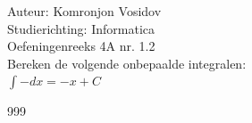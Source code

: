 \documentclass[a4paper]{article}
\newcommand{\dint}{\displaystyle\int}
\begin{document}
	
	\noindent \large Auteur: Komronjon Vosidov \\
	\noindent \large Studierichting: Informatica\\
	\noindent \large Oefeningenreeks 4A nr. 1.2\\
	
	
	\medskip
	\normalsize
	Bereken de volgende onbepaalde integralen:\\
	
	$\dint -dx = -x + C$ \\ 
	
	
	
	
	
	
	\begin{thebibliography}{999}
	\end{thebibliography}		
\end{document}
